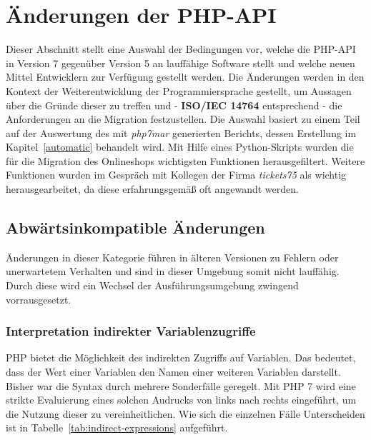 \chapter{Änderungen der PHP-API}\label{ch:php7}
Dieser Abschnitt stellt eine Auswahl der Bedingungen vor, welche die \acs{PHP}-\acs{API} in Version 7 gegenüber Version 5 an lauffähige Software stellt und welche 
neuen Mittel Entwicklern zur Verfügung gestellt werden. Die Änderungen werden in den Kontext der Weiterentwicklung der Programmiersprache gestellt, um Aussagen 
über die Gründe dieser zu treffen und - \textbf{ISO/IEC 14764} entsprechend - die Anforderungen an die Migration festzustellen.
Die Auswahl basiert zu einem Teil auf der Auswertung des mit \textit{php7mar} generierten Berichts, dessen Erstellung im Kapitel~\ref{automatic} behandelt wird. Mit Hilfe eines Python-Skripts 
wurden die für die Migration des Onlineshops wichtigsten Funktionen herausgefiltert. Weitere Funktionen wurden im 
Gespräch mit Kollegen der Firma \textit{tickets75} als wichtig herausgearbeitet, da diese erfahrungsgemäß oft angewandt werden.

\section{Abwärtsinkompatible Änderungen}
Änderungen in dieser Kategorie führen in älteren Versionen zu Fehlern oder unerwartetem Verhalten und sind in dieser Umgebung somit nicht lauffähig. Durch diese wird ein 
Wechsel der Ausführungsumgebung zwingend vorrausgesetzt.

    \subsection{Interpretation indirekter Variablenzugriffe}\label{indirectVar}
    \acs{PHP} bietet die Möglichkeit des indirekten Zugriffs auf Variablen. Das bedeutet, dass der Wert einer Variablen den Namen einer weiteren Variablen darstellt.
    Bisher war die Syntax durch mehrere Sonderfälle geregelt. Mit \acs{PHP} 7 wird eine strikte Evaluierung eines solchen Audrucks von links nach rechts eingeführt, 
    um die Nutzung dieser zu vereinheitlichen. Wie sich die einzelnen Fälle Unterscheiden ist in Tabelle~\ref{tab:indirect-expressions} aufgeführt.

